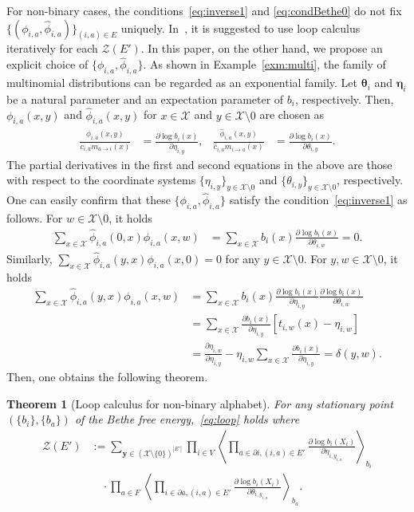 \documentclass[a4paper,10pt,twoside,twocolumn,openany,final]{memoir}
\theoremstyle{plain}
\newtheorem{theorem}{Theorem}
\theoremstyle{definition}
\theoremstyle{remark}
\begin{document}
For non-binary cases, the conditions~\eqref{eq:inverse1} and \eqref{eq:condBethe0}
do not fix $\{(\phi_{i,a}, \hat{\phi}_{i,a})\}_{(i,a)\in E}$ uniquely.
In~\cite{chernyak2007loop}, it is suggested to use loop calculus iteratively for each $\mathcal{Z}(E')$.
In this paper, on the other hand, we propose an explicit choice of $\{\phi_{i,a}, \hat{\phi}_{i,a}\}$.
As shown in Example~\ref{exm:multi}, the family of multinomial distributions can be regarded as an exponential family.
Let $\bm{\theta}_i$ and $\bm{\eta}_i$ be a natural parameter and an expectation parameter of $b_i$, respectively.
Then, $\phi_{i,a}(x, y)$ and $\hat{\phi}_{i,a}(x, y)$ for $x\in\mathcal{X}$ and $y\in \mathcal{X}\setminus 0$ are chosen as
\begin{align*}
\frac{\phi_{i,a}(x, y)}{c_{i,a}m_{a\to i}(x)}
&= \frac{\partial \log b_i(x)}{\partial \eta_{i,y}},&
\frac{\hat{\phi}_{i,a}(x, y)}{\hat{c}_{i,a}m_{i\to a}(x)}
&= \frac{\partial \log b_i(x)}{\partial \theta_{i,y}}.
\end{align*}
The partial derivatives in the first and second equations in the above 
are those with respect to
the coordinate systems $\{\eta_{i,y}\}_{y\in\mathcal{X}\setminus 0}$ and $\{\theta_{i,y}\}_{y\in\mathcal{X}\setminus 0}$, respectively.
One can easily confirm that these $\{\phi_{i,a}, \hat{\phi}_{i,a}\}$ satisfy the condition~\eqref{eq:inverse1} as follows.
For $w\in \mathcal{X}\setminus 0$, it holds
\begin{align*}
\sum_{x\in\mathcal{X}} \hat{\phi}_{i,a}(0,x)\phi_{i,a}(x,w) &=
\sum_{x\in\mathcal{X}} b_i(x)
\frac{\partial \log b_i(x)}{\partial \theta_{i,w}}=0.
\end{align*}
Similarly, $\sum_{x\in\mathcal{X}} \hat{\phi}_{i,a}(y,x)\phi_{i,a}(x,0) = 0$ for any $y\in\mathcal{X}\setminus 0$.
For $y, w\in \mathcal{X}\setminus 0$, it holds
\begin{align*}
\sum_{x\in\mathcal{X}} \hat{\phi}_{i,a}(y,x)\phi_{i,a}(x,w) &=
\sum_{x\in\mathcal{X}} 
b_i(x)
\frac{\partial \log b_i(x)}{\partial \eta_{i,y}}
\frac{\partial \log b_i(x)}{\partial \theta_{i,w}}\\
&=
\sum_{x\in\mathcal{X}} 
\frac{\partial b_i(x)}{\partial \eta_{i,y}}
\left[t_{i, w}(x) - \eta_{i, w}\right]\\
&=
\frac{\partial \eta_{i,w}}{\partial \eta_{i,y}}
-
\eta_{i,w}
\sum_{x\in\mathcal{X}} 
\frac{\partial b_i(x)}{\partial \eta_{i,y}}
 = \delta(y, w).
\end{align*}
Then, one obtains the following theorem.
\begin{theorem}[Loop calculus for non-binary alphabet]\label{thm:non-binary}
For any stationary point $(\{b_i\}, \{b_a\})$ of the Bethe free energy,~\eqref{eq:loop} holds
where
\begin{align*}
\mathcal{Z}(E')&:=\sum_{\bm{y}\in(\mathcal{X}\setminus\{0\})^{|E'|}}
\prod_{i\in V}
\left\langle \prod_{a\in\partial i, (i,a)\in E'} \frac{\partial \log b_i(X_i)}{\partial \eta_{i,y_{i,a}}}\right\rangle_{b_i}\\
&\quad\cdot\prod_{a\in F}
\left\langle \prod_{i\in\partial a, (i,a)\in E'} \frac{\partial \log b_i(X_i)}{\partial \theta_{i,y_{i,a}}}\right\rangle_{b_a}.
\end{align*}
\end{theorem}
\end{document}
